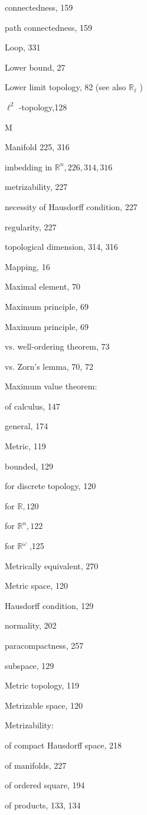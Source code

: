 connectedness, 159

path connectedness, 159

Loop, 331

Lower bound, 27

Lower limit topology, 82 (see also \({\mathbb{R}}_{\ell }\) )

\({\ell }^{2}\) -topology,128

M

Manifold 225, 316

imbedding in \({\mathbb{R}}^{n},{226},{314},{316}\)

metrizability, 227

necessity of Hausdorff condition, 227

regularity, 227

topological dimension, 314, 316

Mapping, 16

Maximal element, 70

Maximum principle, 69

Maximum principle, 69

vs. well-ordering theorem, 73

vs. Zorn's lemma, 70, 72

Maximum value theorem:

of calculus, 147

general, 174

Metric, 119

bounded, 129

for discrete topology, 120

for \(\mathbb{R},{120}\)

for \({\mathbb{R}}^{n},{122}\)

for \({\mathbb{R}}^{\omega }\) ,125

Metrically equivalent, 270

Metric space, 120

Hausdorff condition, 129

normality, 202

paracompactness, 257

subspace, 129

Metric topology, 119

Metrizable space, 120

Metrizability:

of compact Hausdorff space, 218

of manifolds, 227

of ordered square, 194

of products, 133, 134

